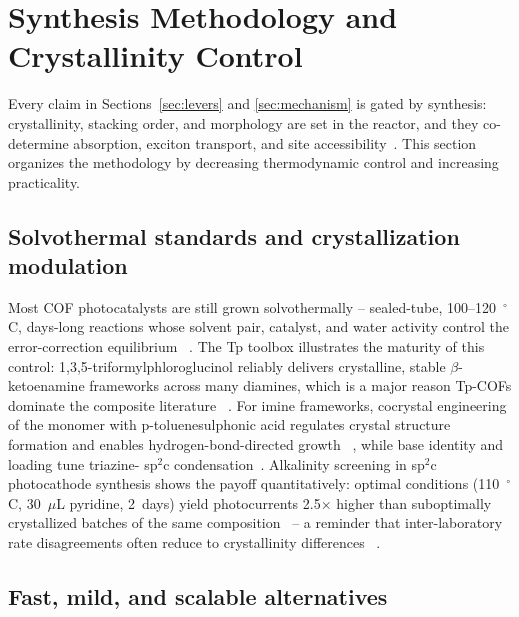 \section{Synthesis Methodology and Crystallinity Control}
\label{sec:synthesis}

Every claim in Sections~\ref{sec:levers} and \ref{sec:mechanism} is gated by
synthesis: crystallinity, stacking order, and morphology are set in the
reactor, and they co-determine absorption, exciton transport, and site
accessibility~\cite{qin2024structural,ran2024progress}. This section
organizes the methodology by decreasing thermodynamic control and increasing
practicality.

\subsection{Solvothermal standards and crystallization modulation}

Most COF photocatalysts are still grown solvothermally -- sealed-tube,
100--120~$^\circ$C, days-long reactions whose solvent pair, catalyst, and
water activity control the error-correction equilibrium
~\cite{wu2025recent,bagheri2020towards}. The Tp toolbox illustrates the
maturity of this control: 1,3,5-triformylphloroglucinol reliably delivers
crystalline, stable $\beta$-ketoenamine frameworks across many diamines,
which is a major reason Tp-COFs dominate the composite literature
~\cite{sujatha20251,xue2023research,wang2023review}. For imine frameworks,
cocrystal engineering of the monomer with p-toluenesulphonic acid regulates
crystal structure formation and enables hydrogen-bond-directed growth
~\cite{chen2024hydrogen}, while base identity and loading tune triazine-
sp$^2$c condensation~\cite{zhang2023design}. Alkalinity screening in
sp$^2$c photocathode synthesis shows the payoff quantitatively: optimal
conditions (110~$^\circ$C, 30~$\mu$L pyridine, 2~days) yield photocurrents
2.5$\times$ higher than suboptimally crystallized batches of the same
composition~\cite{jia2025copper} -- a reminder that inter-laboratory rate
disagreements often reduce to crystallinity differences
~\cite{xiao2024molecular,ghosh2020identification}.

\subsection{Fast, mild, and scalable alternatives}

